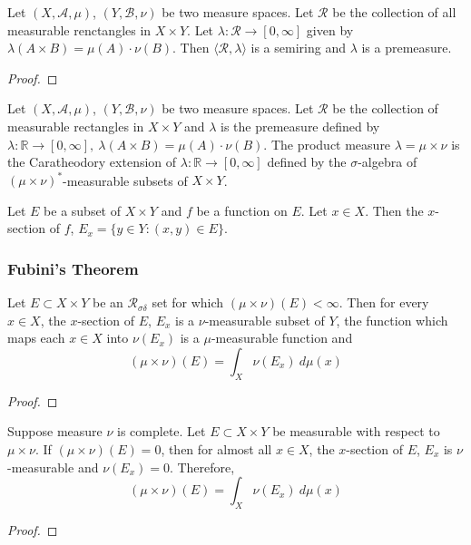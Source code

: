 \begin{theorem}
	Let $(X,\mathcal{A},\mu)$, $(Y,\mathcal{B},\nu)$ be two measure spaces.
	Let $\mathcal{R}$ be the collection of all measurable renctangles in $X \times Y$.
	Let $\lambda : \mathcal{R} \to [0,\infty]$ given by $\lambda(A \times B) = \mu(A) \cdot \nu(B)$.
	Then $\langle \mathcal{R},\lambda \rangle$ is a semiring and $\lambda$ is a premeasure.
\end{theorem}
\begin{proof}
\end{proof}

\begin{definition}
	Let $(X,\mathcal{A},\mu)$, $(Y,\mathcal{B},\nu)$ be two measure spaces.
	Let $\mathcal{R}$ be the collection of measurable rectangles in $X \times Y$ and $\lambda$ is the premeasure defined by $\lambda : \mathbb{R} \to [0,\infty],\ \lambda(A \times B) = \mu(A) \cdot \nu(B)$.
	The product measure $\lambda = \mu \times \nu$ is the Caratheodory extension of $\lambda : \mathbb{R} \to [0,\infty]$ defined by the $\sigma$-algebra of $(\mu \times \nu)^\ast$-measurable subsets of $X \times Y$.
\end{definition}

\begin{definition}[$x$-section]
	Let $E$ be a subset of $X \times Y$ and $f$ be a function on $E$.
	Let $x \in X$.
	Then the $x$-section of $f$, $E_x = \{ y \in Y : (x,y) \in E \}$.
\end{definition}

\subsubsection{Fubini's Theorem}
\begin{lemma}
	Let $E \subset X \times Y$ be an $\mathcal{R}_{\sigma\delta}$ set for which $(\mu \times \nu)(E) < \infty$.
	Then for every $x \in X$, the $x$-section of $E$, $E_x$ is a $\nu$-measurable subset of $Y$, the function which maps each $x \in X$ into $\nu(E_x)$ is a $\mu$-measurable function and
	\begin{equation}
		(\mu \times \nu)(E) = \int_X \nu(E_x) \ d\mu(x)
	\end{equation}
\end{lemma}
\begin{proof}
\end{proof}

\begin{lemma}
	Suppose measure $\nu$ is complete.
	Let $E \subset X \times Y$ be measurable with respect to $\mu \times \nu$.
	If $(\mu \times \nu)(E) = 0$, then for almost all $x \in X$, the $x$-section of $E$, $E_x$ is $\nu$-measurable and $\nu(E_x) = 0$.
	Therefore,
	\begin{equation}
		(\mu \times \nu)(E) = \int_X \nu(E_x) \ d\mu(x)
	\end{equation}
\end{lemma}
\begin{proof}
\end{proof}

